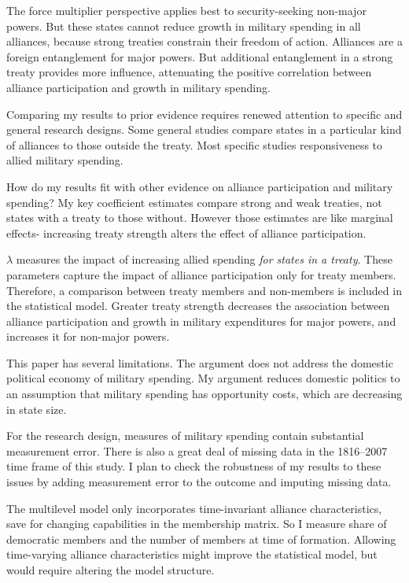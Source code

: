 \documentclass[12pt]{article}
\begin{document}
The force multiplier perspective applies best to security-seeking non-major powers. 
But these states cannot reduce growth in military spending in all alliances, because strong treaties constrain their freedom of action.
Alliances are a foreign entanglement for major powers. 
But additional entanglement in a strong treaty provides more influence, attenuating the positive correlation between alliance participation and growth in military spending. 


Comparing my results to prior evidence requires renewed attention to specific and general research designs. 
Some general studies compare states in a particular kind of alliances to those outside the treaty. 
Most specific studies responsiveness to allied military spending. 


How do my results fit with other evidence on alliance participation and military spending? 
My key coefficient estimates compare strong and weak treaties, not states with a treaty to those without. 
However those estimates are like marginal effects- increasing treaty strength alters the effect of alliance participation.

 
$\lambda$ measures the impact of increasing allied spending \textit{for states in a treaty}. 
These parameters capture the impact of alliance participation only for treaty members. 
Therefore, a comparison between treaty members and non-members is included in the statistical model. 
Greater treaty strength decreases the association between alliance participation and growth in military expenditures for major powers, and increases it for non-major powers. 


This paper has several limitations.
The argument does not address the domestic political economy of military spending. 
My argument reduces domestic politics to an assumption that military spending has opportunity costs, which are decreasing in state size. 


For the research design, measures of military spending contain substantial measurement error. 
There is also a great deal of missing data in the 1816--2007 time frame of this study. 
I plan to check the robustness of my results to these issues by adding measurement error to the outcome and imputing missing data.


The multilevel model only incorporates time-invariant alliance characteristics, save for changing capabilities in the membership matrix. 
So I measure share of democratic members and the number of members at time of formation. 
Allowing time-varying alliance characteristics might improve the statistical model, but would require altering the model structure. 
\end{document}
